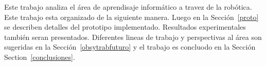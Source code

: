 Este trabajo analiza el \'area de aprendisaje inform\'atico a travez de la rob\'otica.
Este trabajo esta organizado de la siguiente manera.
Luego en la Secci\'on~\ref{proto} se describen detalles del prototipo implementado.
Resultados experimentales tambi\'en seran presentados.
Diferentes lineas de trabajo y perspectivas al \'area son sugeridas en la Secci\'on~\ref{obsytrabfuturo} y el trabajo es concluodo en la Secci\'on Section~\ref{conclusiones}.
